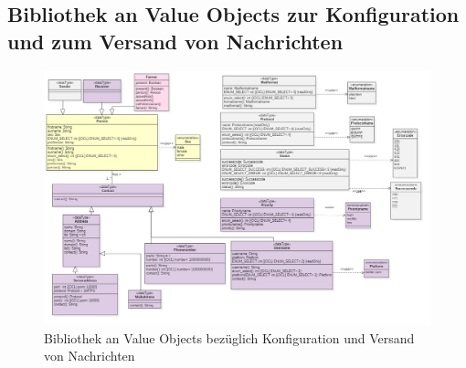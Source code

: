 \begin{landscape}
\subsection{Bibliothek an Value Objects zur Konfiguration und zum Versand von Nachrichten}
\begin{figure}[H]
	\center
	\includegraphics[scale=0.38]{Grafiken/modelle/vo-messaging.jpg}
	\caption{Bibliothek an Value Objects bezüglich Konfiguration und Versand von Nachrichten} 
	\label{fig: Bibliothek an Value Objects zur Konfiguration und zum Versand von Nachrichten}
\end{figure}


\end{landscape}
\restoregeometry %